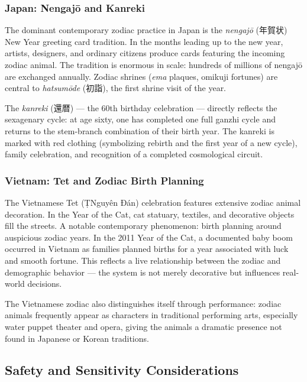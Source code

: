 \documentclass[11pt,letterpaper]{article}
\begin{document}
\subsubsection{Japan: Nengaj\={o} and Kanreki}

The dominant contemporary zodiac practice in Japan is the \textit{nengaj\={o}} (年賀状) New Year greeting card tradition. In the months leading up to the new year, artists, designers, and ordinary citizens produce cards featuring the incoming zodiac animal. The tradition is enormous in scale: hundreds of millions of nengaj\={o} are exchanged annually. Zodiac shrines (\textit{ema} plaques, omikuji fortunes) are central to \textit{hatsum\={o}de} (初詣), the first shrine visit of the year.

The \textit{kanreki} (還暦) --- the 60th birthday celebration --- directly reflects the sexagenary cycle: at age sixty, one has completed one full ganzhi cycle and returns to the stem-branch combination of their birth year. The kanreki is marked with red clothing (symbolizing rebirth and the first year of a new cycle), family celebration, and recognition of a completed cosmological circuit.

\subsubsection{Vietnam: Tet and Zodiac Birth Planning}

The Vietnamese Tet (T\d\ectt Nguy\^en Ð\'{a}n) celebration features extensive zodiac animal decoration. In the Year of the Cat, cat statuary, textiles, and decorative objects fill the streets. A notable contemporary phenomenon: birth planning around auspicious zodiac years. In the 2011 Year of the Cat, a documented baby boom occurred in Vietnam as families planned births for a year associated with luck and smooth fortune. This reflects a live relationship between the zodiac and demographic behavior --- the system is not merely decorative but influences real-world decisions.

The Vietnamese zodiac also distinguishes itself through performance: zodiac animals frequently appear as characters in traditional performing arts, especially water puppet theater and opera, giving the animals a dramatic presence not found in Japanese or Korean traditions.

\subsection{Safety and Sensitivity Considerations}
\end{document}
